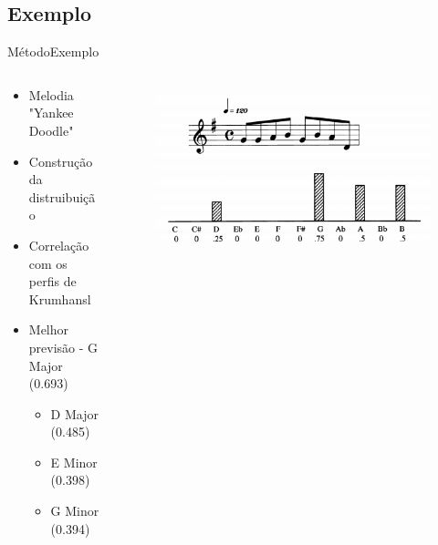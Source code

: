 \subsection{Exemplo}
\begin{frame}{Método}{Exemplo}
    \begin{columns}[]
        \begin{column}{.5\textwidth}
            \begin{itemize}
                \item Melodia "Yankee Doodle"
                \item Construção da distruibuição
                \item Correlação com os perfis de Krumhansl
                \item Melhor previsão - G Major (0.693)
                \begin{itemize}
                    \item D Major (0.485)
                    \item E Minor (0.398)
                    \item G Minor (0.394)
                \end{itemize}
            \end{itemize}
        \end{column}
        \begin{column}{.5\textwidth}
            \begin{figure}
                \includegraphics[width=.9\textwidth]{figs/yankee_song.png}
            \end{figure}
        \end{column}
    \end{columns}
\end{frame}